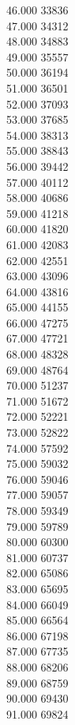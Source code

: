 { 46.000	33836 \\
 47.000	34312 \\
 48.000	34883 \\
 49.000	35557 \\
 50.000	36194 \\
 51.000	36501 \\
 52.000	37093 \\
 53.000	37685 \\
 54.000	38313 \\
 55.000	38843 \\
 56.000	39442 \\
 57.000	40112 \\
 58.000	40686 \\
 59.000	41218 \\
 60.000	41820 \\
 61.000	42083 \\
 62.000	42551 \\
 63.000	43096 \\
 64.000	43816 \\
 65.000	44155 \\
 66.000	47275 \\
 67.000	47721 \\
 68.000	48328 \\
 69.000	48764 \\
 70.000	51237 \\
 71.000	51672 \\
 72.000	52221 \\
 73.000	52822 \\
 74.000	57592 \\
 75.000	59032 \\
 76.000	59046 \\
 77.000	59057 \\
 78.000	59349 \\
 79.000	59789 \\
 80.000	60300 \\
 81.000	60737 \\
 82.000	65086 \\
 83.000	65695 \\
 84.000	66049 \\
 85.000	66564 \\
 86.000	67198 \\
 87.000	67735 \\
 88.000	68206 \\
 89.000	68759 \\
 90.000	69430 \\
 91.000	69824 \\
}
